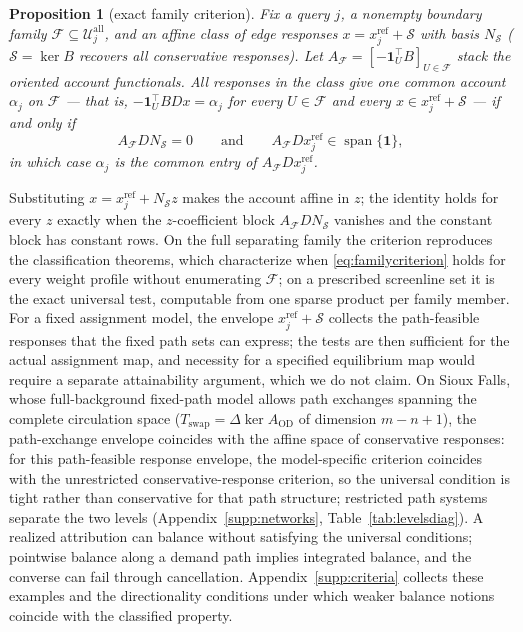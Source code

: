 \documentclass[a4paper,fleqn]{cas-sc}
\newtheorem{proposition}[theorem]{Proposition}
\begin{document}
\begin{proposition}[exact family criterion]\label{prop:familycriterion}
Fix a query $j$, a nonempty boundary family
$\mathcal F\subseteq\mathcal U_j^{\mathrm{all}}$, and an affine class of
edge responses $x=x_j^{\mathrm{ref}}+\mathcal S$ with basis $N_{\mathcal S}$
($\mathcal S=\ker B$ recovers all conservative responses). Let
$A_{\mathcal F}=[-\mathbf 1_U^\top B]_{U\in\mathcal F}$ stack the oriented
account functionals. All responses in the class give one common account
$\alpha_j$ on $\mathcal F$ --- that is,
$-\mathbf 1_U^\top BDx=\alpha_j$ for every $U\in\mathcal F$ and every
$x\in x_j^{\mathrm{ref}}+\mathcal S$ --- if and only if
\begin{equation}
A_{\mathcal F}DN_{\mathcal S}=0
\qquad\text{and}\qquad
A_{\mathcal F}Dx_j^{\mathrm{ref}}\in\operatorname{span}\{\mathbf 1\},
\label{eq:familycriterion}
\end{equation}
in which case $\alpha_j$ is the common entry of $A_{\mathcal F}Dx_j^{\mathrm{ref}}$.
\end{proposition}
Substituting $x=x_j^{\mathrm{ref}}+N_{\mathcal S}z$ makes the account
affine in $z$; the identity holds for every $z$ exactly when the
$z$-coefficient block $A_{\mathcal F}DN_{\mathcal S}$ vanishes and the
constant block has constant rows. On the full separating family the
criterion reproduces the classification theorems, which characterize
when \eqref{eq:familycriterion} holds for every weight profile without
enumerating $\mathcal F$; on a prescribed screenline set it is the exact
universal test, computable from one sparse product per family member.
For a fixed assignment model, the envelope
$x_j^{\mathrm{ref}}+\mathcal S$ collects the path-feasible responses
that the fixed path sets can express; the tests are then sufficient
for the actual assignment map, and necessity for a specified
equilibrium map would require a separate attainability argument, which
we do not claim. On Sioux Falls, whose full-background fixed-path
model allows path exchanges spanning the complete circulation space
($T_{\mathrm{swap}}=\Delta\ker A_{\mathrm{OD}}$ of dimension $m-n+1$),
the path-exchange envelope coincides with the affine space of
conservative responses: for this path-feasible response envelope, the
model-specific criterion coincides with the unrestricted
conservative-response criterion, so the universal condition is tight
rather than conservative for that path structure; restricted path
systems separate the two levels (Appendix~\ref{supp:networks},
Table~\ref{tab:levelsdiag}).
A realized attribution can balance without satisfying the universal
conditions; pointwise balance along a demand path implies integrated
balance, and the converse can fail through cancellation.
Appendix~\ref{supp:criteria} collects these examples and the
directionality conditions under which weaker balance notions coincide
with the classified property.
\end{document}

